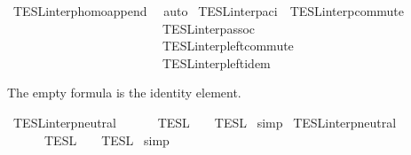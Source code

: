 \begin{isabellebody}
%
\isadelimproof
%
\endisadelimproof
%
\isatagproof
{}\isamarkupfalse%
\ TESL{\isacharunderscore}interp{\isacharunderscore}homo{\isacharunderscore}append\ \isamarkupfalse%
\ auto%
\endisatagproof
{\isafoldproof}%
%
\isadelimproof
\isanewline
%
\endisadelimproof
\isanewline
{}\isamarkupfalse%
\ TESL{\isacharunderscore}interp{\isacharunderscore}aci\ {\isacharequal}\ TESL{\isacharunderscore}interp{\isacharunderscore}commute\isanewline
\ \ \ \ \ \ \ \ \ \ \ \ \ \ \ \ \ \ \ \ \ \ \ \ \ TESL{\isacharunderscore}interp{\isacharunderscore}assoc\isanewline
\ \ \ \ \ \ \ \ \ \ \ \ \ \ \ \ \ \ \ \ \ \ \ \ \ TESL{\isacharunderscore}interp{\isacharunderscore}left{\isacharunderscore}commute\isanewline
\ \ \ \ \ \ \ \ \ \ \ \ \ \ \ \ \ \ \ \ \ \ \ \ \ TESL{\isacharunderscore}interp{\isacharunderscore}left{\isacharunderscore}idem%
\begin{isamarkuptext}%
The empty formula is the identity element.%
\end{isamarkuptext}\isamarkuptrue%
\isamarkupfalse%
\ TESL{\isacharunderscore}interp{\isacharunderscore}neutral{}{\isacharcolon}\isanewline
\ \ {\isacartoucheopen}{\isasymlbrakk}{\isasymlbrakk}\ {\isacharbrackleft}{\isacharbrackright}\ {\isacharat}\ {\isasymPhi}\ {\isasymrbrakk}{\isasymrbrakk}\isactrlsub T\isactrlsub E\isactrlsub S\isactrlsub L\ {\isacharequal}\ {\isasymlbrakk}{\isasymlbrakk}\ {\isasymPhi}\ {\isasymrbrakk}{\isasymrbrakk}\isactrlsub T\isactrlsub E\isactrlsub S\isactrlsub L{\isacartoucheclose}\isanewline
%
\isadelimproof
%
\endisadelimproof
%
\isatagproof
{}\isamarkupfalse%
\ simp%
\endisatagproof
{\isafoldproof}%
%
\isadelimproof
\isanewline
%
\endisadelimproof
\isanewline
{}\isamarkupfalse%
\ TESL{\isacharunderscore}interp{\isacharunderscore}neutral{}{\isacharcolon}\isanewline
\ \ {\isacartoucheopen}{\isasymlbrakk}{\isasymlbrakk}\ {\isasymPhi}\ {\isacharat}\ {\isacharbrackleft}{\isacharbrackright}\ {\isasymrbrakk}{\isasymrbrakk}\isactrlsub T\isactrlsub E\isactrlsub S\isactrlsub L\ {\isacharequal}\ {\isasymlbrakk}{\isasymlbrakk}\ {\isasymPhi}\ {\isasymrbrakk}{\isasymrbrakk}\isactrlsub T\isactrlsub E\isactrlsub S\isactrlsub L{\isacartoucheclose}\isanewline
%
\isadelimproof
%
\endisadelimproof
%
\isatagproof
{}\isamarkupfalse%
\ simp%
\endisatagproof
{\isafoldproof}%
%
\isadelimproof
%
\endisadelimproof
%
\isadelimdocument
%
\endisadelimdocument
%
\isatagdocument
%
\isamarkuptrue%
%
\endisatagdocument

\end{isabellebody}
